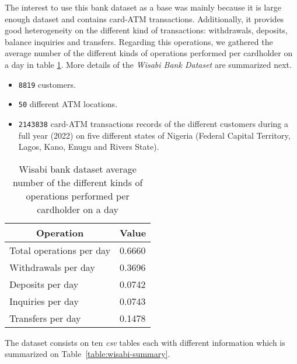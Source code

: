 The interest to use this bank dataset as a base was mainly because it is large enough dataset and contains card-ATM transactions. 
Additionally, it provides good heterogeneity on the different kind of transactions: withdrawals, deposits, balance inquiries and transfers. Regarding this operations, we gathered the average number of the different kinds of operations performed per cardholder on a day in table \ref{table:wisabi-average-num-ops}. More details of the \emph{Wisabi Bank Dataset} are summarized next.
 
\begin{itemize}
    \item \texttt{8819} customers.
    \item \texttt{50} different ATM locations.
    \item \texttt{2143838} card-ATM transactions records of the different customers during a full year (2022) on five different states of Nigeria (Federal Capital Territory, Lagos, Kano, Enugu and Rivers State).
\end{itemize}

\begin{table}[H]
\centering
\begin{tabular}{|l|l|}
\hline
\multicolumn{1}{|c|}{\textbf{Operation}} & \multicolumn{1}{c|}{\textbf{Value}} \\ \hline
Total operations per day & 0.6660 \\ \hline
Withdrawals per day & 0.3696 \\ \hline
Deposits per day & 0.0742 \\ \hline
Inquiries per day & 0.0743 \\ \hline
Transfers per day & 0.1478 \\ \hline
\end{tabular}
\caption{Wisabi bank dataset average number of the different kinds of operations performed per cardholder on a day}
\label{table:wisabi-average-num-ops}
\end{table}

The dataset consists on ten \emph{csv} tables each with different information which is summarized on Table~\ref{table:wisabi-summary}.

